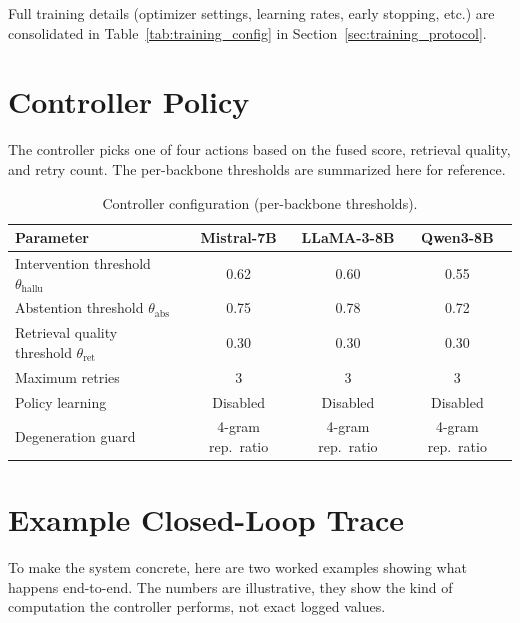 Full training details (optimizer settings, learning rates, early stopping, etc.) are consolidated in Table~\ref{tab:training_config} in Section~\ref{sec:training_protocol}.

\newpage

\section{Controller Policy}
\label{sec:controller_policy_ch5}

The controller picks one of four actions based on the fused score, retrieval quality, and retry count. The per-backbone thresholds are summarized here for reference.

\begin{table}[!htb]
\centering
\caption{Controller configuration (per-backbone thresholds).}
\label{tab:controller_config}
\begin{tabular}{@{}lccc@{}}
\toprule
\textbf{Parameter} & \textbf{Mistral-7B} & \textbf{LLaMA-3-8B} & \textbf{Qwen3-8B} \\
\midrule
Intervention threshold $\theta_{\text{hallu}}$ & 0.62 & 0.60 & 0.55 \\
Abstention threshold $\theta_{\text{abs}}$     & 0.75 & 0.78 & 0.72 \\
Retrieval quality threshold $\theta_{\text{ret}}$ & 0.30 & 0.30 & 0.30 \\
Maximum retries & 3 & 3 & 3 \\
Policy learning & Disabled & Disabled & Disabled \\
Degeneration guard & 4-gram rep.\ ratio & 4-gram rep.\ ratio & 4-gram rep.\ ratio \\
\bottomrule
\end{tabular}
\end{table}

\section{Example Closed-Loop Trace}
\label{sec:example_trace_ch5}

To make the system concrete, here are two worked examples showing what happens end-to-end. The numbers are illustrative, they show the kind of computation the controller performs, not exact logged values.

